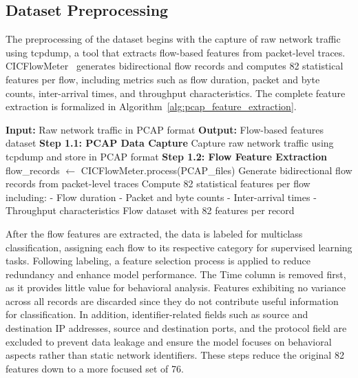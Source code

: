 \documentclass[journal,article,submit,moreauthors,pdftex]{Definitions/tsp}
\begin{document}
\subsection{Dataset Preprocessing}


The preprocessing of the dataset begins with the capture of raw network traffic using tcpdump, a tool that extracts flow-based features from packet-level traces. CICFlowMeter~\cite{HieulwCicflowmeterCICFlowmeter} generates bidirectional flow records and computes 82 statistical features per flow, including metrics such as flow duration, packet and byte counts, inter-arrival times, and throughput characteristics. The complete feature extraction is formalized in Algorithm~\ref{alg:pcap_feature_extraction}.

\begin{algorithm}[H]
\caption{PCAP Feature Extraction for 5G Roaming Traffic}
\label{alg:pcap_feature_extraction}
\begin{algorithmic}[1]
\State \textbf{Input:} Raw network traffic in PCAP format
\State \textbf{Output:} Flow-based features dataset
\State \textbf{Step 1.1: PCAP Data Capture}
\State \quad Capture raw network traffic using tcpdump and store in PCAP format
\State \textbf{Step 1.2: Flow Feature Extraction}
\State \quad flow\_records $\gets$ CICFlowMeter.process(PCAP\_files)
\State \quad Generate bidirectional flow records from packet-level traces
\State \quad Compute 82 statistical features per flow including:
\State \quad \quad - Flow duration
\State \quad \quad - Packet and byte counts  
\State \quad \quad - Inter-arrival times
\State \quad \quad - Throughput characteristics
\State \Return Flow dataset with 82 features per record
\end{algorithmic}
\end{algorithm}

After the flow features are extracted, the data is labeled for multiclass classification, assigning each flow to its respective category for supervised learning tasks. Following labeling, a feature selection process is applied to reduce redundancy and enhance model performance. The Time column is removed first, as it provides little value for behavioral analysis. Features exhibiting no variance across all records are discarded since they do not contribute useful information for classification. In addition, identifier-related fields such as source and destination IP addresses, source and destination ports, and the protocol field are excluded to prevent data leakage and ensure the model focuses on behavioral aspects rather than static network identifiers. These steps reduce the original 82 features down to a more focused set of 76.
\end{document}
